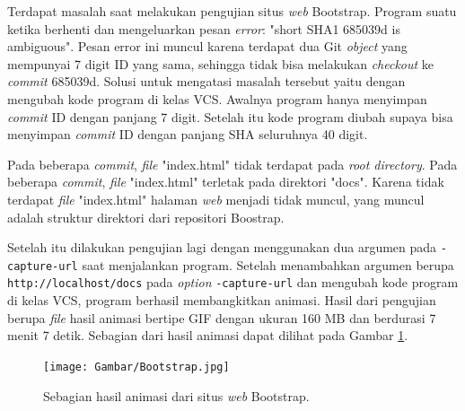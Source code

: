 \begin{enumerate}


Terdapat masalah saat melakukan pengujian situs \textit{web} Bootstrap. Program suatu ketika berhenti dan mengeluarkan pesan \textit{error}: "short SHA1 685039d is ambiguous". Pesan error ini muncul karena terdapat dua Git \textit{object} yang mempunyai 7 digit ID yang sama, sehingga tidak bisa melakukan \textit{checkout} ke \textit{commit} 685039d. Solusi untuk mengatasi masalah tersebut yaitu dengan mengubah kode program di kelas VCS. Awalnya program hanya menyimpan \textit{commit} ID dengan panjang 7 digit. Setelah itu kode program diubah supaya bisa menyimpan \textit{commit} ID dengan panjang SHA seluruhnya 40 digit.

Pada beberapa \textit{commit}, \textit{file} "index.html" tidak terdapat pada \textit{root directory}. Pada beberapa \textit{commit}, \textit{file} "index.html" terletak pada direktori "docs". Karena tidak terdapat \textit{file} "index.html" halaman \textit{web} menjadi tidak muncul, yang muncul adalah struktur direktori dari repositori Boostrap. 

Setelah itu dilakukan pengujian lagi dengan menggunakan dua argumen pada \texttt{-capture-url}  saat menjalankan program. Setelah menambahkan argumen berupa \texttt{http://localhost/docs} pada \textit{option} \texttt{-capture-url} dan mengubah kode program di kelas VCS, program berhasil membangkitkan animasi. Hasil dari pengujian berupa \textit{file} hasil animasi bertipe GIF dengan ukuran 160 MB dan berdurasi 7 menit 7 detik. Sebagian dari hasil animasi dapat dilihat pada Gambar \ref{fig:hasil_bootstrap}.


\begin{figure}[H]	
		\texttt{[image: Gambar/Bootstrap.jpg]}
	\caption{Sebagian hasil animasi dari situs \textit{web} Bootstrap.}
	\label{fig:hasil_bootstrap}
\end{figure}




\end{enumerate}
